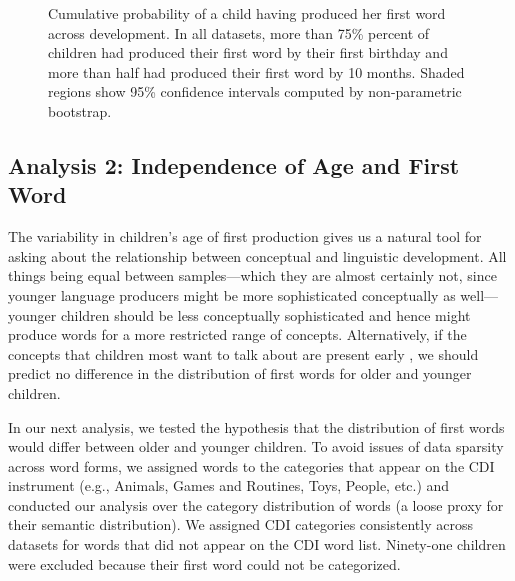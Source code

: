 \documentclass[10pt,letterpaper]{article}
\begin{document}
\begin{figure}[]
\caption{\label{fig:cdfs} Cumulative probability of a child having produced her first word across development. In all datasets, more than 75\% percent of children had produced their first word by their first birthday and more than half had produced their first word by 10 months. Shaded regions show 95\% confidence intervals computed by non-parametric bootstrap.}
\end{figure}


\subsection{Analysis 2: Independence of Age and First Word}

The variability in children's age of first production gives us a natural tool for asking about the relationship between conceptual and linguistic development. All things being equal between samples---which they are almost certainly not, since younger language producers might be more sophisticated conceptually as well---younger children should be less conceptually sophisticated and hence might produce words for a more restricted range of concepts. Alternatively, if the concepts that children most want to talk about are present early \cite{snedeker2007,snedeker2012,gleitman1990}, we should predict no difference in the distribution of first words for older and younger children. 

In our next analysis, we tested the hypothesis that the distribution of first words would differ between older and younger children. To avoid issues of data sparsity across word forms, we assigned words to the categories that appear on the CDI instrument (e.g., Animals, Games and Routines, Toys, People, etc.) and conducted our analysis over the category distribution of words (a loose proxy for their semantic distribution). We assigned CDI categories consistently across datasets for words that did not appear on the CDI word list. Ninety-one children were excluded because their first word could not be categorized. 
\end{document}
